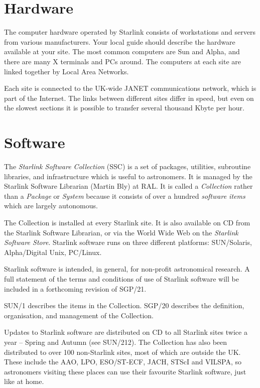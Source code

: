 \documentclass[twoside]{article}
\newcommand{\htmladdnormallink}[2]{#1}
\newcommand{\xref}[3]{#1}
\begin{document}
\newpage

\section{Hardware}

The computer hardware operated by Starlink consists of workstations and
servers from various manufacturers.
Your local guide should describe the hardware available at your site.
The most common computers are Sun and Alpha, and there are many X terminals
and PCs around.
The computers at each site are linked together by Local Area Networks.

Each site is connected to the UK-wide JANET communications network, which is
part of the Internet.
The links between different sites differ in speed, but even on the slowest
sections it is possible to transfer several thousand Kbyte per hour.

\newpage

\section{Software}

The {\em Starlink Software Collection}\/ (SSC) is a set of packages, utilities,
subroutine libraries, and infrastructure which is useful to astronomers.
It is managed by the Starlink Software Librarian (Martin Bly) at RAL.
It is called a {\em Collection}\/ rather than a {\em Package}\/ or
{\em System}\/ because it consists of over a hundred {\em software items}\/
which are largely autonomous.

The Collection is installed at every Starlink site.
It is also available on CD from the Starlink Software Librarian, or via
the World Wide Web on the
{\em \htmladdnormallink{Starlink Software Store}
{http://www.starlink.ac.uk/cgi-store/storetop}}.
Starlink software runs on three different platforms: SUN/Solaris,
Alpha/Digital Unix, PC/Linux.

Starlink software is intended, in general, for non-profit astronomical research.
A full statement of the terms and conditions of use of Starlink software
will be included in a forthcoming revision of SGP/21.

\xref{SUN/1}{sun1}{} describes the items in the Collection.
\xref{SGP/20}{sgp20}{} describes the definition, organisation, and management
of the Collection.

Updates to Starlink software are distributed on CD to all Starlink sites
twice a year -- Spring and Autumn (see \xref{SUN/212}{sun212}{}).
The Collection has also been distributed to over 100 non-Starlink sites, most of
which are outside the UK.
These include the AAO, LPO, ESO/ST-ECF, JACH, STScI and VILSPA, so astronomers
visiting these places can use their favourite Starlink software, just like at
home.
\end{document}
